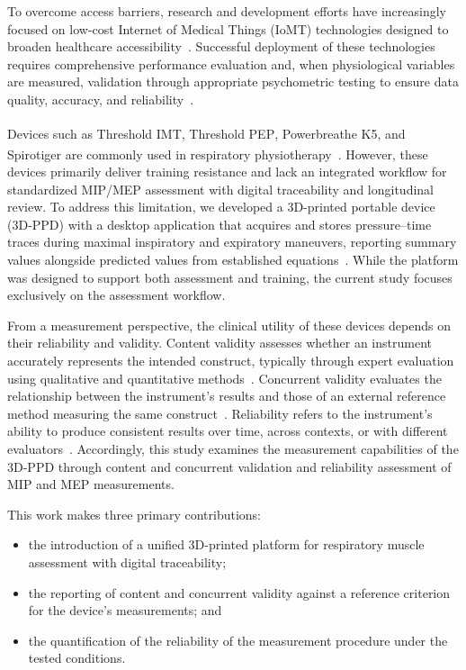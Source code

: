\documentclass{ieeeaccess}
\begin{document}
To overcome access barriers, research and development efforts have increasingly focused on low-cost Internet of Medical Things (IoMT) technologies designed to broaden healthcare accessibility~\cite{sepiacciSystematicReviewMetaAnalysis2025}. Successful deployment of these technologies requires comprehensive performance evaluation and, when physiological variables are measured, validation through appropriate psychometric testing to ensure data quality, accuracy, and reliability~\cite{Pegoraro2018}.

Devices such as Threshold IMT\textsuperscript{\tiny\textregistered}, Threshold PEP\textsuperscript{\tiny\textregistered}, Powerbreathe K5, and Spirotiger\textsuperscript{\tiny\textregistered} are commonly used in respiratory physiotherapy~\cite{paivaInspiratoryMuscleTraining2015,fernandez-lazaroInspiratoryMuscleTraining2021}. However, these devices primarily deliver training resistance and lack an integrated workflow for standardized MIP/MEP assessment with digital traceability and longitudinal review. To address this limitation, we developed a 3D-printed portable device (3D-PPD) with a desktop application that acquires and stores pressure--time traces during maximal inspiratory and expiratory maneuvers, reporting summary values alongside predicted values from established equations~\cite{araujoReferenceValuesRespiratory2024}. While the platform was designed to support both assessment and training, the current study focuses exclusively on the assessment workflow.

From a measurement perspective, the clinical utility of these devices depends on their reliability and validity. Content validity assesses whether an instrument accurately represents the intended construct, typically through expert evaluation using qualitative and quantitative methods~\cite{Souza2017}. Concurrent validity evaluates the relationship between the instrument's results and those of an external reference method measuring the same construct~\cite{Duckworth2011}. Reliability refers to the instrument's ability to produce consistent results over time, across contexts, or with different evaluators~\cite{Nunnally1994}. Accordingly, this study examines the measurement capabilities of the 3D-PPD through content and concurrent validation and reliability assessment of MIP and MEP measurements.

This work makes three primary contributions:

\begin{itemize}
    \item the introduction of a unified 3D-printed platform for respiratory muscle assessment with digital traceability;
    \item the reporting of content and concurrent validity against a reference criterion for the device's measurements; and
    \item the quantification of the reliability of the measurement procedure under the tested conditions.
\end{itemize}
\end{document}
